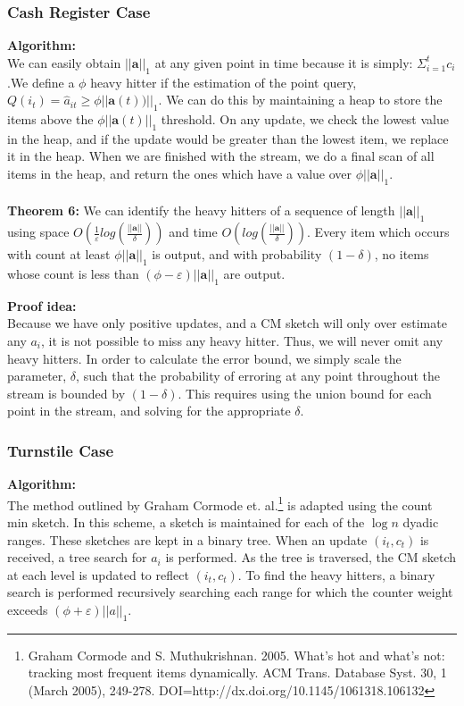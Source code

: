 \documentclass[11pt]{article}
\begin{document}
\subsubsection{Cash Register Case}
\textbf{Algorithm:}\\
We can easily obtain $||\bm{a}||_1$ at any given point in time because it is simply: $\Sigma_{i=1}^t c_i$.We define a $\phi$ heavy hitter if the estimation of the point query, $Q(i_t) =  \hat a_{it} \geq \phi ||\bm{a}(t))||_1$. We can do this by maintaining a heap to store the items above the $\phi||\bm{a}(t)||_1$ threshold. On any update, we check the lowest value in the heap, and if the update would be greater than the lowest item, we replace it in the heap. When we are finished with the stream, we do a final scan of all items in the heap, and return the ones which have a value over $\phi||\bm{a}||_1$.\\\\
\textbf{Theorem 6: } We can identify the heavy hitters of a sequence of length $||\bm{a}||_1$ using space $O(\frac{1}{\varepsilon}log(\frac{||\bm{a}||}{\delta}))$ and time $O(log(\frac{||\bm{a}||}{\delta}))$. Every item which occurs with count at least
$\phi ||\bm{a}||_1$ is output, and with probability $(1-\delta)$, no items whose count is less than $(\phi - \varepsilon)||\bm{a}||_1$ are output.

\textbf{Proof idea:}\\
Because we have only positive updates, and a CM sketch will only over estimate any $a_i$,
it is not possible to miss any heavy hitter. Thus, we will never omit any heavy
hitters. In order to calculate the error bound, we simply scale the parameter, $\delta$, such that the probability of erroring at any point throughout the stream is bounded by $(1-\delta)$. This requires using the union bound for each point in the stream, and solving for the appropriate $\delta$.

\subsubsection{Turnstile Case}
\textbf{Algorithm:}\\
The method outlined by Graham Cormode et. al.\footnote{Graham Cormode and S. Muthukrishnan. 2005. What's hot and what's not: tracking most frequent items dynamically. ACM Trans. Database Syst. 30, 1 (March 2005), 249-278. DOI=http://dx.doi.org/10.1145/1061318.106132} is adapted using the count min sketch. In this scheme, a sketch is maintained for each of the $\log n$ dyadic ranges. These sketches are kept in a binary tree. When an update $(i_t, c_t)$ is received, a tree search for $a_i$ is performed. As the tree is traversed, the CM sketch at each level is updated to reflect $(i_t, c_t)$. To find the heavy hitters, a binary search is performed recursively searching each range for which the counter weight exceeds $(\phi + \varepsilon)||a||_1$.
\end{document}
